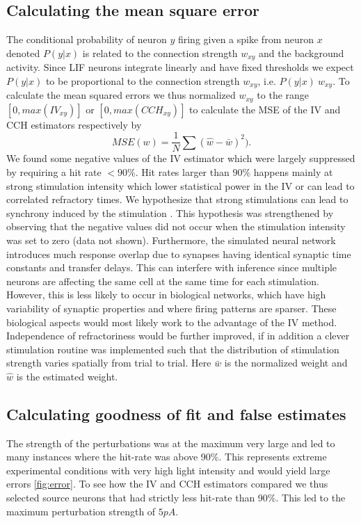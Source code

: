 \documentclass[11pt]{article}
\begin{document}
\subsection{Calculating the mean square error}
The conditional probability of neuron $y$ firing given a spike from neuron $x$ denoted $P(y|x)$ is related to the connection strength $w_{xy}$ and the background activity. 
Since LIF neurons integrate linearly and have fixed thresholds we expect $P(y|x)$ to be proportional to the connection strength $w_{xy}$, i.e.  $P(y|x) ~ w_{xy}$. 
To calculate the mean squared errors we thus normalized $w_{xy}$ to the range $[0, max(IV_{xy})]$ or $[0, max(CCH_{xy})]$ to calculate the MSE of the IV and CCH estimators respectively by
\begin{equation*}
    MSE(w) = \frac{1}{N}\sum(\hat{w} - \bar{w})^2).
\end{equation*}We found some negative values of the IV estimator which were largely suppressed by requiring a hit rate $ < 90\%$. 
Hit rates larger than $90\%$ happens mainly at strong stimulation intensity which lower statistical power in the IV or can lead to correlated refractory times. 
We hypothesize that strong stimulations can lead to synchrony induced by the stimulation \citep{ermentrout2008reliability}. 
This hypothesis was strengthened by observing that the negative values did not occur when the stimulation intensity was set to zero (data not shown). 
Furthermore, the simulated neural network introduces much response overlap due to synapses having identical synaptic time constants and transfer delays. 
This can interfere with inference since multiple neurons are affecting the same cell at the same time for each stimulation. 
However, this is less likely to occur in biological networks, which have high variability of synaptic properties and where firing patterns are sparser. 
These biological aspects would most likely work to the advantage of the IV method. 
Independence of refractoriness would be further improved, if in addition a clever stimulation routine was implemented such that the distribution of stimulation strength varies spatially from trial to trial.
Here $\bar{w}$ is the normalized weight and $\hat{w}$ is the estimated weight.

\subsection{Calculating goodness of fit and false estimates}
The strength of the perturbations was at the maximum very large and led to many instances where the hit-rate was above 90\%. 
This represents extreme experimental conditions with very high light intensity and would yield large errors \cref{fig:error}. 
To see how the IV and CCH estimators compared we thus selected source neurons that had strictly less hit-rate than 90\%. 
This led to the maximum perturbation strength of $5pA$.
\end{document}
